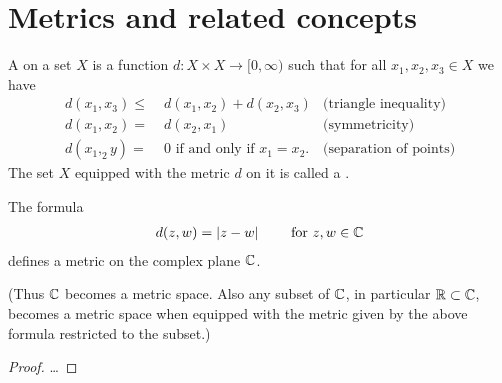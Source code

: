\section{Metrics and related concepts}

\begin{definition}[Metric]
  \label{def:metric_space}
  A  on a set $X$ is a function
  $d \colon X \times X \to [0,\infty)$ such that
  for all $x_1, x_2, x_3 \in X$ we have
  \begin{align*}
    d(x_1,x_3) \le \; & d(x_1,x_2) + d(x_2,x_3)
            & \text{(triangle inequality)} \\
    d(x_1,x_2) = \; & d(x_2,x_1)
            & \text{(symmetricity)} \\
    d(x_1,_2y) = \; & 0 \text{ if and only if } x_1 = x_2 .
            & \text{(separation of points)}
  \end{align*}
  The set $X$ equipped with the metric $d$ on
  it is called a .
\end{definition}

\begin{lemma}
  \label{lem:metric_on_C}
  The formula
  \begin{align*}
    d(z,w) = |z - w|
    \qquad \text{ for } z,w \in \mathbb{C}
  \end{align*}
  defines a metric on the complex plane $\mathbb{C}$.

  (Thus $\mathbb{C}$ becomes a metric space. Also any subset of $\mathbb{C}$,
  in particular $\mathbb{R} \subset \mathbb{C}$, becomes a metric space when equipped
  with the metric given by the above formula restricted to the subset.)
\end{lemma}
\begin{proof}
  \ldots
\end{proof}

